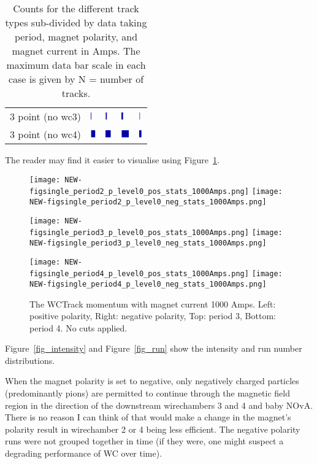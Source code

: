 \begin{table}[h]
\begin{subtable}[t]{0.48\textwidth}
\begin{tabular}{lllll}
			3 point (no wc3) & $\mybarb{0.026944444444444444}$ & $\mybarb{0.0525}$ & $\mybarb{0.06444444444444444}$ & $\mybarb{0.0175}$ \\
			3 point (no wc4) & $\mybarb{0.16416666666666666}$ & $\mybarb{0.20527777777777778}$ & $\mybarb{0.29638888888888887}$ & $\mybarb{0.09722222222222222}$ \\
			\bottomrule
		\end{tabular}
		\label{tab_p4_neg}
	\end{subtable}
	\caption[]{Counts for the different track types sub-divided by data taking period, magnet polarity, and magnet current in Amps. The maximum data bar scale in each case is given by N = number of tracks.}
	\label{tab_counts}
\end{table}

  
The reader may find it easier to visualise using Figure~\ref{fig_momentum}.

  \begin{figure}[h]
    \centering   
     	\texttt{[image: NEW-figsingle\_period2\_p\_level0\_pos\_stats\_1000Amps.png]}
	 \texttt{[image: NEW-figsingle\_period2\_p\_level0\_neg\_stats\_1000Amps.png]}
	 
   	\texttt{[image: NEW-figsingle\_period3\_p\_level0\_pos\_stats\_1000Amps.png]}
	 \texttt{[image: NEW-figsingle\_period3\_p\_level0\_neg\_stats\_1000Amps.png]}
	 
 	\texttt{[image: NEW-figsingle\_period4\_p\_level0\_pos\_stats\_1000Amps.png]}
	 \texttt{[image: NEW-figsingle\_period4\_p\_level0\_neg\_stats\_1000Amps.png]}
   \caption[short]{The WCTrack momentum with magnet current 1000 Amps. Left: positive polarity, Right: negative polarity, Top: period 3, Bottom: period 4. No cuts applied.}
   \label{fig_momentum}
  \end{figure}
 
 
 Figure~\ref{fig_intensity} and  Figure~\ref{fig_run} show the intensity and run number distributions.
  
When the magnet polarity is set to negative, only negatively charged particles (predominantly pions) are permitted to continue through the magnetic field region in the direction of the downstream wirechambers 3 and 4 and baby NOvA. There is no reason I can think of that would make a change in the magnet's polarity result in wirechamber 2 or 4 being less efficient. The negative polarity runs were not grouped together in time (if they were, one might suspect a degrading performance of WC over time).

